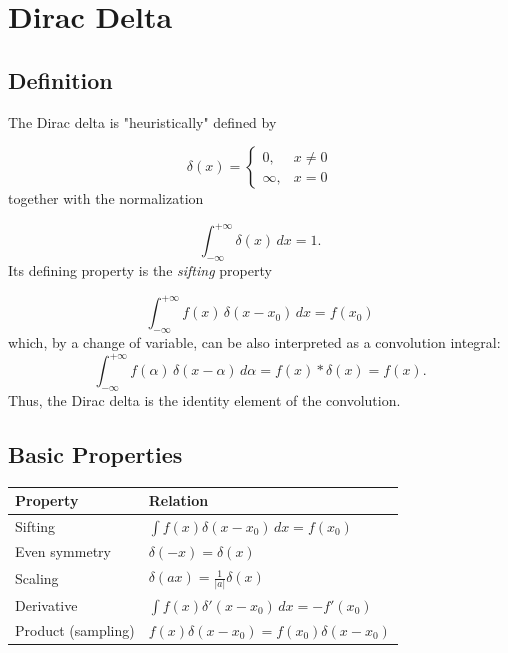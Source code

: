 %
%

\chapter{Dirac Delta}

\section{Definition}

The Dirac delta is "heuristically" defined by

\[
\delta(x)=
\begin{cases}
0,&x\neq0\\
\infty,&x=0
\end{cases}
\]
together with the normalization

\[
\int_{-\infty}^{+\infty}\delta(x)\,dx=1.
\]
Its defining property is the \textit{sifting} property

\[
\boxed{
\int_{-\infty}^{+\infty}
f(x)\,\delta(x-x_0)\,dx
=
f(x_0)
}
\]
which, by a change of variable, can be also interpreted as a convolution integral:
\[
\boxed{
\int_{-\infty}^{+\infty}
f(\alpha)\,\delta(x-\alpha)\,d\alpha
= f(x) * \delta(x) = f(x).
}
\]
Thus, the Dirac delta is the identity element of the convolution.
\section{Basic Properties}

\begin{center}
\begin{tabular}{ll}
\toprule
Property & Relation\\
\midrule

Sifting &
$\int f(x)\delta(x-x_0)\,dx=f(x_0)$
\\[0.3cm]

Even symmetry &
$\delta(-x)=\delta(x)$
\\[0.3cm]

Scaling &
$\displaystyle
\delta(ax)=\frac{1}{|a|}\delta(x)
$
\\[0.3cm]

Derivative &
$\displaystyle
\int f(x)\delta'(x-x_0)\,dx=-f'(x_0)
$
\\[0.3cm]

Product (sampling) &
$\displaystyle
f(x)\delta(x-x_0)
=
f(x_0)\delta(x-x_0)
$
\\%

\bottomrule
\end{tabular}
\end{center}


